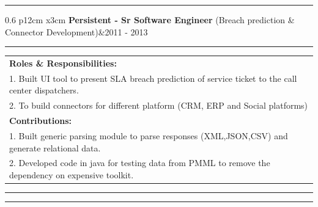 \documentclass[10pt,A4]{article}
\newcommand{\tzlarrow}{(0,0) -- (0.2,0) -- (0.3,0.2) -- (0.2,0.4) -- (0,0.4) -- (0.1,0.2) -- cycle;}
\newcommand{\larrow}[1]
{\begin{tikzpicture}[scale=0.58]
	 \filldraw[fill=#1!100,draw=#1!100!black]  \tzlarrow
 \end{tikzpicture}
}
\newcommand{\cvevent}[5]
{
\vspace{8pt}
	\begin{tabular*}{0.6\linewidth}{ p{12cm} x{3cm}}
\textbf{#2} \textcolor{bgcol}{(#3)}&\textcolor{bgcol}{#1}\\[4pt]
	\end{tabular*}
\vspace{-12pt}
\textcolor{softcol}{\hrule}
\vspace{6pt}
	\begin{tabular*}{1\textwidth}{l}
		 \larrow{sectcol}  #4\\[4.5pt]
		 \larrow{sectcol}  #5\\[6pt]
	\end{tabular*}
\vspace{-4pt}
}
\begin{document}
{\begin{minipage}[c][0.70\textheight][t]{\linewidth}
{\textcolor{softcol}{\hrule}


\cvevent{2011 - 2013}{Persistent - Sr Software Engineer}{Breach prediction \& Connector Development} 
{\textbf{Roles \& Responsibilities:}\\
1. Built UI tool to present SLA breach prediction of service ticket to the call center dispatchers.\\
2. To build connectors for different platform (CRM, ERP and Social platforms)}{\textbf{Contributions:}\\
1. Built generic parsing module to parse responses (XML,JSON,CSV) and generate relational data.\\
2. Developed code in java for testing data from PMML to remove the dependency on expensive toolkit.}




\textcolor{softcol}{\hrule}
}
\hspace{18pt}
\textcolor{sectcol}{\rule[-0.2cm]{2pt}{7cm}}
\hspace{12pt}
\end{minipage}}\\[-4pt]


\\[-4pt]
\end{document}
